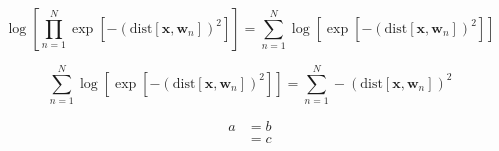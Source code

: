 \documentclass[a4paper,12pt]{article}
\begin{document}
\begin{equation}
\log{[\prod_{n=1}^N \exp{[-(\text{dist}[\mathbf{x},\mathbf{w}_n])^2]}]}=\sum_{n=1}^N \log{[\exp{[-(\text{dist}[\mathbf{x},\mathbf{w}_n])^2]}]}
\end{equation}

\begin{equation}
\sum_{n=1}^N \log{[\exp{[-(\text{dist}[\mathbf{x},\mathbf{w}_n])^2]}]}=\sum_{n=1}^N -(\text{dist}[\mathbf{x},\mathbf{w}_n])^2
\end{equation}

\begin{equation}
\begin{split}
a & = b \\
  & = c
\end{split}  
\end{equation}
\end{document}
